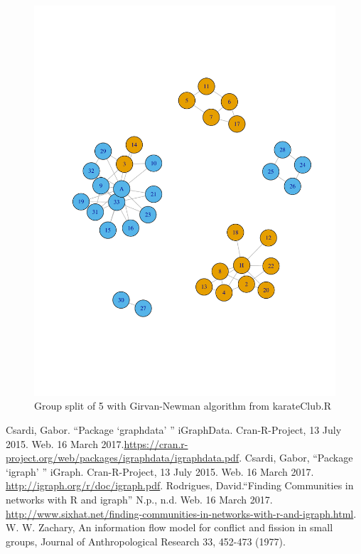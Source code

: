 \documentclass[letterpaper,11pt]{article}
\begin{document}
\begin{figure}[h]
\centering
\includegraphics[scale=0.6]{predictedSplit5.pdf}
\caption{Group split of 5 with Girvan-Newman algorithm from karateClub.R}
\label{fig:split5}
\end{figure}



\clearpage


\begin{thebibliography}{9}
Csardi, Gabor. ``Package `graphdata' '' iGraphData. Cran-R-Project, 13 July 2015. Web. 16 March 2017.\url{https://cran.r-project.org/web/packages/igraphdata/igraphdata.pdf}.
Csardi, Gabor, ``Package `igraph' '' iGraph. Cran-R-Project, 13 July 2015. Web. 16 March 2017. \url{http://igraph.org/r/doc/igraph.pdf}.
Rodrigues, David.``Finding Communities in networks with R and igraph'' N.p., n.d. Web. 16 March 2017. \url{http://www.sixhat.net/finding-communities-in-networks-with-r-and-igraph.html}.
W. W. Zachary, An information flow model for conflict and fission in small groups, Journal of Anthropological Research 33, 452-473 (1977).
\end{thebibliography}
\end{document}
